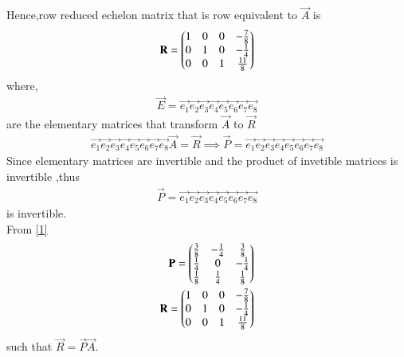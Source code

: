 \documentclass[journal,12pt,twocolumn]{IEEEtran}
\begin{document}
Hence,row reduced echelon matrix that is row equivalent to $\vec{A}$ is \\
\begin{align}
\mathbf{R}=\begin{pmatrix}1&0&0&-\frac{7}{8}\\0&1&0&-\frac{1}{4}\\0&0&1&\frac{11}{8}\end{pmatrix}
\end{align}
where,
\begin{align}
    \Vec{E}=\vec{e_1}\vec{e_2}\vec{e_3}\vec{e_4}\vec{e_5}\vec{e_6}\vec{e_7}\vec{e_8}
\end{align}
are the elementary matrices that transform $\vec{A}$ to $\vec{R}$
\begin{align}
  \vec{e_1}\vec{e_2}\vec{e_3}\vec{e_4}\vec{e_5}\vec{e_6}\vec{e_7}\vec{e_8}\vec{A}=\vec{R}\implies\vec{P}=\vec{e_1}\vec{e_2}\vec{e_3}\vec{e_4}\vec{e_5}\vec{e_6}\vec{e_7}\vec{e_8}  
\end{align}
Since elementary matrices are invertible and the product of invetible matrices is invertible ,thus
\begin{align}
  \vec{P}=\vec{e_1}\vec{e_2}\vec{e_3}\vec{e_4}\vec{e_5}\vec{e_6}\vec{e_7}\vec{e_8}  
\end{align}
is invertible.\\
From \eqref{1}
\begin{align}
\mathbf{P}=\begin{pmatrix}\frac{3}{8}&-\frac{1}{4}&\frac{3}{8}\\\frac{1}{4}&0&-\frac{1}{4}\\\frac{1}{8}&\frac{1}{4}&\frac{1}{8}\end{pmatrix}\\
\mathbf{R}=\begin{pmatrix}1&0&0&-\frac{7}{8}\\0&1&0&-\frac{1}{4}\\0&0&1&\frac{11}{8}\end{pmatrix}
\end{align}
such that $\vec{R}=\vec{P}\vec{A}$.
\end{document}
